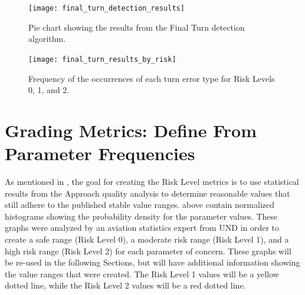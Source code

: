            \begin{figure}
            	\centering
                \texttt{[image: final\_turn\_detection\_results]}
                \caption{Pie chart showing the results from the Final Turn detection algorithm.}
                \label{fig:final_turn_results_ratios}
            \end{figure}
            
            \begin{figure}
            	\centering
                \texttt{[image: final\_turn\_results\_by\_risk]}
                \caption{Frequency of the occurrences of each turn error type for Risk Levels 0, 1, and 2.}
                \label{fig:final_turn_results_by_risk}
            \end{figure}
            
        
        


\section{Grading Metrics:  Define From Parameter Frequencies}

	As mentioned in , the goal for creating the Risk Level metrics is to use statistical results from the Approach quality analysis to determine reasonable values that still adhere to the published stable value ranges.   above contain normalized histograms showing the probability density for the parameter values.  These graphs were analyzed by an aviation statistics expert from UND in order to create a safe range (Risk Level 0), a moderate risk range (Risk Level 1), and a high risk range (Risk Level 2) for each parameter of concern.  These graphs will be re-used in the following Sections, but will have additional information showing the value ranges that were created.  The Risk Level 1 values will be a yellow dotted line, while the Risk Level 2 values will be a red dotted line.


